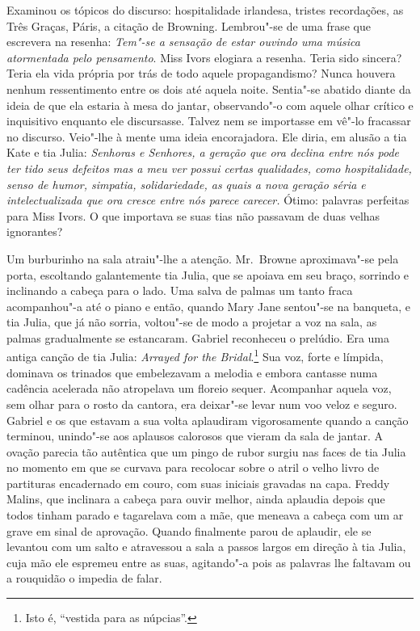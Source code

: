 Examinou os tópicos do discurso: hospitalidade irlandesa, tristes recordações,
as Três Graças, Páris, a citação de Browning.  Lembrou"-se de uma frase que
escrevera na resenha: \textit{Tem"-se a sensação de estar ouvindo uma música
atormentada pelo pensamento}.  Miss Ivors elogiara a resenha.  Teria sido
sincera?  Teria ela vida própria por trás de todo aquele propagandismo?  Nunca
houvera nenhum ressentimento entre os dois até aquela noite.  Sentia"-se abatido
diante da ideia de que ela estaria à mesa do jantar, observando"-o com aquele
olhar crítico e inquisitivo enquanto ele discursasse.  Talvez nem se importasse
em vê"-lo fracassar no discurso.  Veio"-lhe à mente uma ideia encorajadora.  Ele
diria, em alusão a tia Kate e tia Julia: \textit{Senhoras e Senhores, a geração
que ora declina entre nós pode ter tido seus defeitos mas a
meu ver possui certas qualidades, como hospitalidade, senso de humor,
simpatia, solidariedade, as quais a nova geração séria e
intelectualizada que ora cresce entre nós parece carecer.} Ótimo:
palavras perfeitas para Miss Ivors.  O que importava se suas tias não passavam
de duas velhas ignorantes?

Um burburinho na sala atraiu"-lhe a atenção.  Mr.~Browne aproximava"-se pela
porta, escoltando galantemente tia Julia, que se apoiava em seu braço, sorrindo
e inclinando a cabeça para o lado.  Uma salva de palmas um tanto fraca
acompanhou"-a até o piano e então, quando Mary Jane sentou"-se na banqueta, e tia
Julia, que já não sorria, voltou"-se de modo a projetar a voz na sala, as palmas
gradualmente se estancaram.  Gabriel reconheceu o prelúdio.  Era uma antiga
canção de tia Julia: \textit{Arrayed for the Bridal}.\footnote{ Isto é,
“vestida para as núpcias”.}  Sua voz, forte e límpida, dominava os
trinados que embelezavam a melodia e embora cantasse numa cadência acelerada
não atropelava um floreio sequer.  Acompanhar aquela voz, sem olhar para o
rosto da cantora, era deixar"-se levar num voo veloz e seguro.  Gabriel e os que
estavam a sua volta aplaudiram vigorosamente quando a canção terminou,
unindo"-se aos aplausos calorosos que vieram da sala de jantar.  A ovação
parecia tão autêntica que um pingo de rubor surgiu nas faces de tia Julia no
momento em que se curvava para recolocar sobre o atril o velho livro de
partituras encadernado em couro, com suas iniciais gravadas na capa.  Freddy
Malins, que inclinara a cabeça para ouvir melhor, ainda aplaudia depois que
todos tinham parado e tagarelava com a mãe, que meneava a cabeça com um ar
grave em sinal de aprovação.  Quando finalmente parou de aplaudir, ele se
levantou com um salto e atravessou a sala a passos largos em direção à tia
Julia, cuja mão ele espremeu entre as suas, agitando"-a pois as palavras lhe
faltavam ou a rouquidão o impedia de falar.

